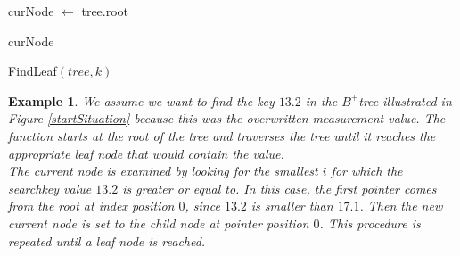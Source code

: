 \documentclass[abstracton,12pt,oneside]{scrreprt}
\newtheorem{example}{Example}
\begin{document}

\begin{algorithm}[H]
	\IncMargin{1em}
	\SetAlgoLined
	\DontPrintSemicolon

		curNode $\leftarrow$ tree.root\; 
		
	
	\Return curNode\;


	\caption{FindLeaf$(tree, k)$}	\label{findLeaf}
\end{algorithm}

\begin{example}
	We assume we want to find the key $13.2$ in the $B^+$tree illustrated in Figure \ref{startSituation} because this was the overwritten measurement value. The function starts at the root of the tree and traverses the tree until it reaches the appropriate leaf node that would contain the value.\\
	The current node is examined by looking for the smallest $i$ for which the searchkey value $13.2$ is greater or equal to.  In this case, the first pointer comes from the root at index position $0$, since $13.2$ is smaller than $17.1$. Then the new current node is set to the child node at pointer position $0$. This procedure is repeated until a leaf node is reached. 
\end{example} 
\end{document}
